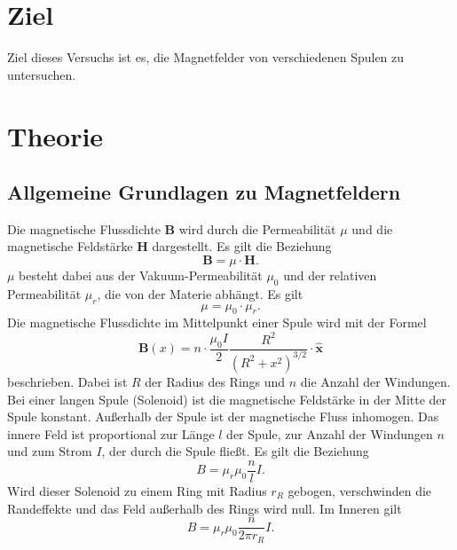 \section{Ziel}
Ziel dieses Versuchs ist es, die Magnetfelder von verschiedenen
Spulen zu untersuchen. %

\section{Theorie}
\label{sec:Theorie}

\cite{V308}

\subsection{Allgemeine Grundlagen zu Magnetfeldern} %
Die magnetische Flussdichte $\symbf{B}$ wird durch die Permeabilität $\mu$ und die 
magnetische Feldstärke $\symbf{H}$ dargestellt. Es gilt die Beziehung 
\begin{equation*} 
    \symbf{B} = \mu \cdot \symbf{H}.
\end{equation*}
$\mu$ besteht dabei aus der Vakuum-Permeabilität $\mu_{0}$ und der relativen 
Permeabilität $\mu_{r}$, die von der Materie abhängt. 
Es gilt 
\begin{equation*} 
    \mu = \mu_{0} \cdot \mu_{r}.
\end{equation*}
\newline
Die magnetische Flussdichte im Mittelpunkt einer Spule wird mit der Formel 
\begin{equation}
    \symbf{B}(x)= n \cdot \frac{\mu_{0} I}{2} \frac{R^2}{(R^2 +x^2)^{3/2}}\cdot \symbf{\hat{x}}
\end{equation}
beschrieben. 
Dabei ist $R$ der Radius des Rings und $n$ die Anzahl der Windungen.
Bei einer langen Spule (Solenoid) ist die magnetische Feldstärke in der Mitte der 
Spule konstant. Außerhalb der Spule ist der magnetische Fluss inhomogen. 
Das innere Feld ist proportional zur Länge $l$ der Spule, zur Anzahl der Windungen 
$n$ und zum Strom $I$, der durch die Spule fließt. 
Es gilt die Beziehung
\begin{equation}
B = \mu_{r} \mu_{0} \frac{n}{l} I.
\end{equation}
Wird dieser Solenoid zu einem Ring mit Radius $r_{R}$ gebogen, verschwinden die 
Randeffekte und das Feld außerhalb des Rings wird null. 
Im Inneren gilt
\begin{equation}
B = \mu_{r} \mu_{0} \frac{n}{2\pi r_{R}} I.
\end{equation}

